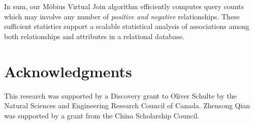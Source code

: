 \documentclass{sig-alternate-2013}
\begin{document}
In sum, our M\"obius Virtual Join algorithm efficiently computes query counts which may involve any number of {\em positive and negative }relationships. %
These sufficient statistics support a scalable statistical analysis of  associations among both relationships and attributes in a relational database.


\section*{Acknowledgments}
This research was supported by a Discovery grant to Oliver Schulte by the Natural Sciences and Engineering Research Council of Canada. 
Zhensong Qian was  supported by a grant from the China Scholarship Council.




 

\balance
\end{document}

